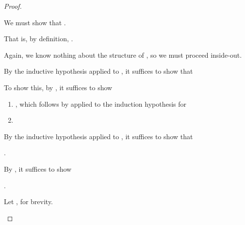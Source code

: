 {\begin{proof}
\begin{proofcases}
    \item {}

      We must show that \im{\styjudg{\anfh{\slenv}}{\anf{\sappe{\seone}{\setwo}}{\tK}}{\tB}}.

      That is, by definition, \im{\styjudg{\anfh{\slenv}}{\anf{\seone}{\tlete{\txone}{\hole}{\anf{\setwo}{\tlete{\txtwo}{\hole}{\tK\hw{\tappe{\txone}{\txtwo}}}}}}}{\tB}}.

      Again, we know nothing about the structure of \im{\anf{\seone}{\tKpr}}, so we must proceed inside-out.

      By the inductive hypothesis applied to \im{\styjudg{\slenv}{\seone}{\subst{\sBpr}{\seone}{\sx}}}, it suffices to show that

      \im{\styjudg{\anfh{\slenv},\edefs{\seone}}{\begin{stackTL}\tlete{\txone}{\hole}{\\\,\,\anf{\setwo}{\tlete{\txtwo}{\hole}{\tK\hw{\tappe{\txone}{\txtwo}}}}}}{(\ehole{\seone} : \anfh{\spity{\sx}{\sApr}{\sBpr}}) \Rightarrow \tB}\end{stackTL}}

      To show this, by , it suffices to show

      \begin{enumerate}[leftmargin=*]
      \item
        \im{\styjudg{\anfh{\slenv},\edefs{\seone}}{\ehole{\seone}}{\anfh{\spity{\sx}{\sApr}{\sBpr}}}},
        which follows by 
        applied to the induction hypothesis for
        \im{\styjudg{\slenv}{\seone}{\spity{\sx}{\sApr}{\sBpr}}}
      \item \im{\styjudg{\anfh{\slenv},\edefs{\seone},\txone=\ehole{\seone}}{\anf{\setwo}{\tlete{\txtwo}{\hole}{\tK\hw{\tappe{\txone}{\txtwo}}}}}{\tB}}
      \end{enumerate}

      By the inductive hypothesis applied to \im{\styjudg{\slenv}{\setwo}{\sApr}}, it suffices to show that

      \im{\styjudg{\anfh{\slenv},\edefs{\seone},\txone=\ehole{\seone},\edefs{\setwo}}{\tlete{\txtwo}{\hole}{\tK\hw{\tappe{\txone}{\txtwo}}}}{\tB}}.

      By , it suffices to show

      \im{\styjudg{\anfh{\slenv},\edefs{\seone},\txone=\ehole{\seone},\edefs{\setwo},\txtwo=\ehole{\setwo}}{\tK\hw{\tappe{\txone}{\txtwo}}}{\tB}}.

      Let \im{\tlenvpr = {\anfh{\slenv},\edefs{\seone},\txone=\ehole{\seone},\edefs{\setwo},\txtwo=\ehole{\setwo}}}, for brevity.


\end{proofcases}
\end{proof}}
